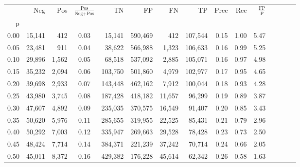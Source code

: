 \begin{tabular}{rrrcrrrrrrrrrrr}
\toprule
{} &     Neg &    Pos & $\frac{\text{Pos}}{\text{Neg}+\text{Pos}}$ &       TN &       FP &       FN &       TP &  Prec &   Rec & $\frac{\text{FP}}{\text{P}}$ \\
p    &         &        &                                            &          &          &          &          &       &       &                              \\
\midrule
0.00 &  15,141 &    412 &                                       0.03 &   15,141 &  590,469 &      412 &  107,544 &  0.15 &  1.00 &                         5.47 \\
0.05 &  23,481 &    911 &                                       0.04 &   38,622 &  566,988 &    1,323 &  106,633 &  0.16 &  0.99 &                         5.25 \\
0.10 &  29,896 &  1,562 &                                       0.05 &   68,518 &  537,092 &    2,885 &  105,071 &  0.16 &  0.97 &                         4.98 \\
0.15 &  35,232 &  2,094 &                                       0.06 &  103,750 &  501,860 &    4,979 &  102,977 &  0.17 &  0.95 &                         4.65 \\
0.20 &  39,698 &  2,933 &                                       0.07 &  143,448 &  462,162 &    7,912 &  100,044 &  0.18 &  0.93 &                         4.28 \\
0.25 &  43,980 &  3,745 &                                       0.08 &  187,428 &  418,182 &   11,657 &   96,299 &  0.19 &  0.89 &                         3.87 \\
0.30 &  47,607 &  4,892 &                                       0.09 &  235,035 &  370,575 &   16,549 &   91,407 &  0.20 &  0.85 &                         3.43 \\
0.35 &  50,620 &  5,976 &                                       0.11 &  285,655 &  319,955 &   22,525 &   85,431 &  0.21 &  0.79 &                         2.96 \\
0.40 &  50,292 &  7,003 &                                       0.12 &  335,947 &  269,663 &   29,528 &   78,428 &  0.23 &  0.73 &                         2.50 \\
0.45 &  48,424 &  7,714 &                                       0.14 &  384,371 &  221,239 &   37,242 &   70,714 &  0.24 &  0.66 &                         2.05 \\
0.50 &  45,011 &  8,372 &                                       0.16 &  429,382 &  176,228 &   45,614 &   62,342 &  0.26 &  0.58 &                         1.63 \\

\end{tabular}
